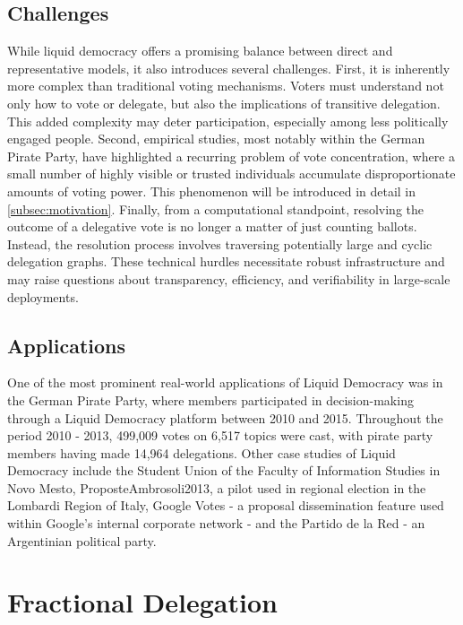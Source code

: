 \subsection{Challenges}

While liquid democracy offers a promising balance between direct and representative models, it also introduces several challenges. First, it is inherently more complex than traditional voting mechanisms. Voters must understand not only how to vote or delegate, but also the implications of transitive delegation. This added complexity may deter participation, especially among less politically engaged people. Second, empirical studies, most notably within the German Pirate Party, have highlighted a recurring problem of vote concentration, where a small number of highly visible or trusted individuals accumulate disproportionate amounts of voting power. This phenomenon will be introduced in detail in \cref{subsec:motivation}. Finally, from a computational standpoint, resolving the outcome of a delegative vote is no longer a matter of just counting ballots. Instead, the resolution process involves traversing potentially large and cyclic delegation graphs. These technical hurdles necessitate robust infrastructure and may raise questions about transparency, efficiency, and verifiability in large-scale deployments.

\subsection{Applications}

One of the most prominent real-world applications of Liquid Democracy was in the German Pirate Party, where members participated in decision-making through a Liquid Democracy platform between 2010 and 2015. Throughout the period 2010 - 2013, 499,009 votes on 6,517 topics were cast, with pirate party members having made 14,964 delegations. \cite{klingVotingBehaviourPower2015} Other case studies of Liquid Democracy include the Student Union of the Faculty of Information Studies in Novo Mesto, ProposteAmbrosoli2013, a pilot used in regional election in the Lombardi Region of Italy, Google Votes - a proposal dissemination feature used within Google’s internal corporate network - and the Partido de la Red - an Argentinian political party. \cite{paulinOverviewTenYears2020}

\section{Fractional Delegation}

